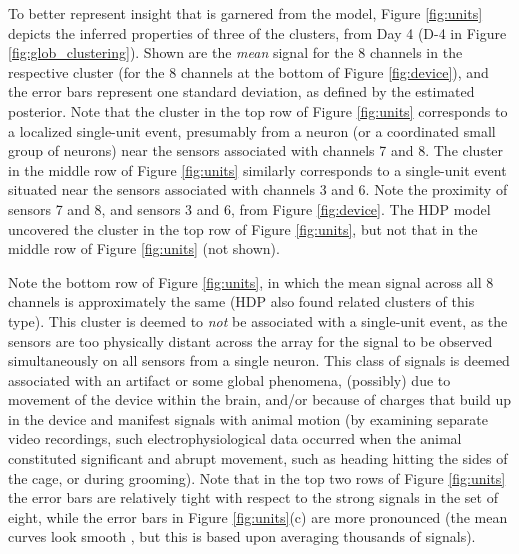 \documentclass[journal]{IEEEtran}
\begin{document}
To better represent insight that is garnered from the model,  Figure \ref{fig:units} {depicts } the inferred properties of three of the clusters, from Day 4 (D-4 in Figure \ref{fig:glob_clustering}). Shown are the \emph{mean} signal for the 8 channels in the respective cluster (for the 8 channels at the bottom of Figure \ref{fig:device}), and the error bars represent one standard deviation, as defined by the estimated posterior. Note that the cluster in {the top row of} Figure \ref{fig:units} corresponds to a localized single-unit event, presumably from a neuron (or a coordinated small group of neurons) near the sensors associated with channels 7 and 8. The cluster in {the middle row of } Figure \ref{fig:units} similarly corresponds to a single-unit event situated near the sensors associated with channels 3 and 6. Note the proximity of sensors 7 and 8, and sensors 3 and 6, from Figure \ref{fig:device}. The HDP model uncovered the cluster in {the top row of } Figure \ref{fig:units}, but not that in {the middle row of } Figure \ref{fig:units} {(not shown)}.

Note {the bottom row of} Figure \ref{fig:units}, in which the mean signal across all 8 channels is approximately the same (HDP also found related clusters of this type). This cluster is deemed to \emph{not} be associated with a single-unit event, as the sensors are too physically distant across the array for the signal to be observed simultaneously on all sensors from a single neuron. This class of signals is deemed associated with an artifact or some global phenomena, (possibly) due to movement of the device within the brain, and/or because of charges that build up in the device and manifest signals with animal motion (by examining separate video recordings, such electrophysiological data occurred when the animal constituted significant and abrupt movement, such as heading hitting the sides of the cage, or during grooming). Note that in {the top two rows of} Figure \ref{fig:units} the error bars are relatively tight with respect to the strong signals in the set of eight, while the error bars in Figure \ref{fig:units}(c) are more pronounced (the mean curves look {smooth}
, but this is based upon averaging thousands of signals).
\end{document}
